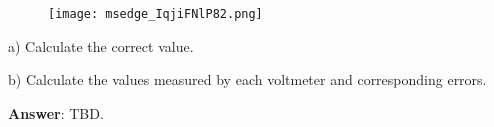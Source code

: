 \documentclass{article}
\begin{document}
\begin{figure}[H]
    \centering
    \texttt{[image: msedge\_IqjiFNlP82.png]}
\end{figure}

{\quad a) Calculate the correct value.}

{\quad b) Calculate the values measured by each voltmeter and corresponding errors.}

\vspace{4mm}

{\textbf{Answer}: TBD.}

\vspace{8mm}


\end{document}
